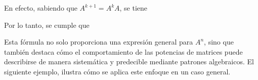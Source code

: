 \begin{examplebox}{}{}
\begin{enumerate}[label=\roman*., topsep=6pt, itemsep=0pt]
        \begin{matrizn}
        \end{matrizn}
        En efecto, sabiendo que $A^{k + 1} = A^kA$, se tiene
        \begin{matrizn}
        \end{matrizn}
    \end{enumerate}
    Por lo tanto, se cumple que
    \begin{matrizn}
    \end{matrizn}
\end{examplebox}

\newpage

Esta fórmula no solo proporciona una expresión general para $A^n$, sino que también destaca cómo el comportamiento de las potencias de matrices puede describirse de manera sistemática y predecible mediante patrones algebraicos. El siguiente ejemplo, ilustra cómo se aplica este enfoque en un caso general.

